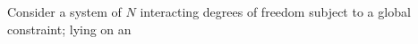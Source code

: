 Consider a system of $N$ interacting degrees of freedom subject to a global constraint; lying on an 